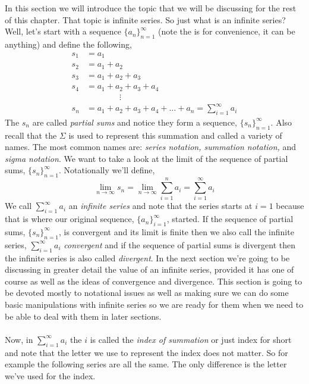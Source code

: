 \documentclass[10pt,reqno]{book}
\theoremstyle{definition}
\begin{document}
	In this section we will introduce the topic that we will be discussing for the rest of this chapter. That topic is infinite series. So just what is an infinite series? Well, let's start with a sequence $ \{a_n \}_{n=1}^{\infty} $ (note the  is for convenience, it can be anything) and define the following,
	\begin{align*}
		s_1 &= a_1\\
		s_2 &= a_1 + a_2\\
		s_3 &= a_1 + a_2 + a_3\\
		s_4 &= a_1 + a_2 + a_3 + a_4\\
			& \qquad \qquad \vdots\\
		s_n &= a_1 + a_2 + a_3 + a_4 + \ldots + a_n = \sum\limits_{i=1}^{\infty} a_i
	\end{align*}
	The $ s_n $ are called \textit{partial sums} and notice they form a sequence, $ \{ s_n \}_{n=1}^{\infty} $. Also recall that the $ \Sigma $ is used to represent this summation and called a variety of names. The most common names are: \textit{series notation, summation notation,} and \textit{sigma notation}. We want to take a look at the limit of the sequence of partial sums, $ \{ s_n \}_{n=1}^{\infty} $. Notationally we'll define,
	\[ \lim\limits_{n \to \infty} s_n = \lim\limits_{n \to \infty} \sum\limits_{i=1}^{n} a_i = \sum\limits_{i=1}^{\infty} a_i \]
	We call $ \sum\limits_{i=1}^{\infty} a_i $ an \textit{infinite series} and note that the series starts at $ i = 1 $ because that is where our original sequence, $ \{ a_n \}_{i=1}^{\infty} $, started. If the sequence of partial sums, $ \{ s_n \}_{n=1}^{\infty} $, is convergent and its limit is finite then we also call the infinite series, $ \sum\limits_{i=1}^{\infty} a_i $ \textit{convergent} and if the sequence of partial sums is divergent then the infinite series is also called \textit{divergent}. In the next section we're going to be discussing in greater detail the value of an infinite series, provided it has one of course as well as the ideas of convergence and divergence. This section is going to be devoted mostly to notational issues as well as making sure we can do some basic manipulations with infinite series so we are ready for them when we need to be able to deal with them in later sections.\\ \\
	Now, in $ \sum\limits_{i=1}^{\infty} a_i $ the $ i $ is called the \textit{index of summation} or just index for short and note that the letter we use to represent the index does not matter. So for example the following series are all the same. The only difference is the letter we've used for the index.
\end{document}
